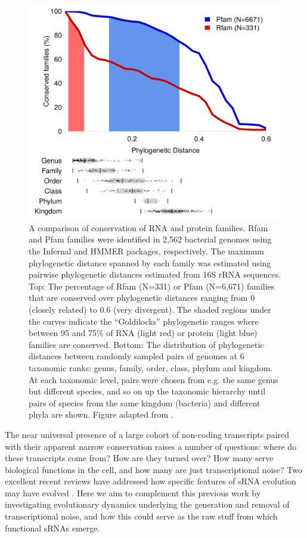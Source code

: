 \begin{figure}[H]
  \includegraphics[scale=0.1]{lit_review/lindgreen.png}
  \caption{A comparison of conservation of RNA and protein families. Rfam and Pfam families were identified in 2,562 bacterial genomes using the Infernal and HMMER packages, respectively. The maximum phylogenetic distance spanned by each family was estimated using pairwise phylogenetic distances estimated from 16S rRNA sequences. Top: The percentage of Rfam (N=331) or Pfam (N=6,671) families that are conserved over phylogenetic distances ranging from 0 (closely related) to 0.6 (very divergent). The shaded regions under the curves indicate the “Goldilocks” phylogenetic ranges where between 95 and 75\% of RNA (light red) or protein (light blue) families are conserved. Bottom: The distribution of phylogenetic distances between randomly sampled pairs of genomes at 6 taxonomic ranks: genus, family, order, class, phylum and kingdom. At each taxonomic level, pairs were chosen from e.g. the same genus but different species, and so on up the taxonomic hierarchy until pairs of species from the same kingdom (bacteria) and different phyla are shown. Figure adapted from \citep{Lindgreen2014-dk}.}
  \label{fig:lindgreen}
\end{figure}
     
The near universal presence of a large cohort of non-coding transcripts paired with their apparent narrow conservation raises a number of questions: where do these transcripts come from? How are they turned over? How many serve biological functions in the cell, and how many are just transcriptional noise? Two excellent recent reviews have addressed how specific features of sRNA evolution may have evolved \citep{Updegrove2015-qr, Dutcher2018-ku}. Here we aim to complement this previous work by investigating evolutionary dynamics underlying the generation and removal of transcriptional noise, and how this could serve as the raw stuff from which functional sRNAs emerge.

